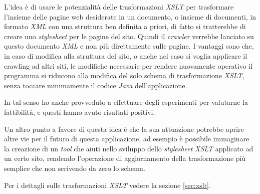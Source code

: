 \documentclass[tesi.tex]{subfiles}
\begin{document}
L'idea \`e di usare le potenzialit\`a delle trasformazioni \emph{XSLT}
per trasformare l'insieme delle pagine web desiderate in un documento, o insieme
di documenti, in formato \emph{XML} con una struttura ben definita a
priori, di fatto si tratterebbe di creare uno \emph{stylesheet} per le
pagine del sito. Quindi il \emph{crawler} verrebbe lanciato su questo documento
\emph{XML} e non pi\`u direttamente sulle pagine. I vantaggi sono che, in caso di modifica alla struttura del
sito, o anche nel caso si voglia applicare il crawling ad altri siti,
le modifiche necessarie per rendere nuovamente operativo il programma
si riducono alla modifica del solo schema di trasformazione
\emph{XSLT}, senza toccare minimamente il codice \emph{Java}
dell'applicazione.

In tal senso ho anche provveduto a effettuare degli esperimenti per
valutarne la fattibilit\`a, e questi hanno avuto risultati positivi.

Un altro punto a favore di questa idea \`e che la sua attuazione
potrebbe aprire altre vie per il futuro di questa applicazione, ad
esempio \`e possibile immaginare la creazione di un \emph{tool} che
aiuti nello sviluppo dello \emph{stylesheet} \emph{XSLT} applicato ad un certo sito,
rendendo l'operazione di aggiornamento della trasformazione pi\`u
semplice che non scrivendo da zero lo schema.

Per i dettagli sulle trasformazioni \emph{XSLT} vedere la sezione
\ref{sec:xslt}.
\end{document}

